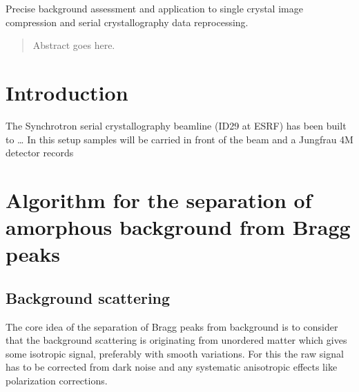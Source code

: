 \documentclass[preprint]{iucr}              %
\begin{document}
\maketitle                        %

\begin{synopsis}
Precise background assessment and application to single crystal image compression and serial crystallography data reprocessing. 
\end{synopsis}

\begin{abstract}
Abstract goes here.
\end{abstract}



\section{Introduction}

The Synchrotron serial crystallography beamline (ID29 at ESRF) has been built to \ldots
In this setup samples will be carried in front of the beam and a Jungfrau 4M detector records 


\section{Algorithm for the separation of amorphous background from Bragg peaks}
\subsection{Background scattering}
The core idea of the separation of Bragg peaks from background is to consider that the background scattering 
is originating from unordered matter which gives some isotropic signal, preferably with smooth variations.
For this the raw signal has to be corrected from dark noise and any systematic anisotropic effects like polarization corrections.
\end{document}
